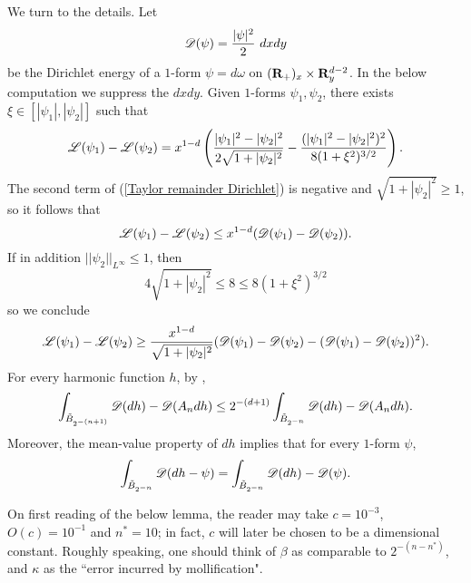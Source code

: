 We turn to the details.
Let
$$\mathscr D(\psi) = \frac{|\psi|^2}{2} ~dxdy$$
be the Dirichlet energy of a $1$-form $\psi = d\omega$ on $(\mathbf{R}_+)_x \times \mathbf{R}^{d - 2}_y$.
In the below computation we suppress the $dxdy$.
Given $1$-forms $\psi_1, \psi_2$, there exists $\xi \in [|\psi_1|, |\psi_2|]$ such that
\begin{equation}\label{Taylor remainder Dirichlet}
\mathscr L(\psi_1) - \mathscr L(\psi_2) = x^{1 - d}\left(\frac{|\psi_1|^2 - |\psi_2|^2}{2\sqrt{1 + |\psi_2|^2}} - \frac{(|\psi_1|^2 - |\psi_2|^2)^2}{8(1 + \xi^2)^{3/2}}\right).
\end{equation}
The second term of (\ref{Taylor remainder Dirichlet}) is negative and $\sqrt{1 + |\psi_2|^2} \geq 1$, so it follows that
\begin{equation}\label{Taylor lower bound}
\mathscr L(\psi_1) - \mathscr L(\psi_2) \leq x^{1 - d} (\mathscr D(\psi_1) - \mathscr D(\psi_2)).
\end{equation}
If in addition $||\psi_2||_{L^\infty} \leq 1$, then
$$4\sqrt{1 + |\psi_2|^2} \leq 8 \leq 8(1 + \xi^2)^{3/2}$$
so we conclude
\begin{equation}\label{Taylor upper bound}
\mathscr L(\psi_1) - \mathscr L(\psi_2) \geq \frac{x^{1 - d}}{\sqrt{1 + |\psi_2|^2}} (\mathscr D(\psi_1) - \mathscr D(\psi_2) - (\mathscr D(\psi_1) - \mathscr D(\psi_2))^2).
\end{equation}
For every harmonic function $h$, by \cite[Lemma 4.1]{Miranda66},
\begin{equation}\label{Miranda41}
\int_{\tilde B_{2^{-(n+1)}}} \mathscr D(dh) - \mathscr D(A_n dh) \leq 2^{-(d + 1)} \int_{\tilde B_{2^{-n}}} \mathscr D(dh) - \mathscr D(A_n dh).
\end{equation}
Moreover, the mean-value property of $dh$ implies that for every $1$-form $\psi$,
\begin{equation}\label{MVP derivative}
\int_{\tilde B_{2^{-n}}} \mathscr D(dh - \psi) = \int_{\tilde B_{2^{-n}}} \mathscr D(dh) - \mathscr D(\psi).
\end{equation}

On first reading of the below lemma, the reader may take $c = 10^{-3}$, $O(c) = 10^{-1}$ and $n^* = 10$; in fact, $c$ will later be chosen to be a dimensional constant.
Roughly speaking, one should think of $\beta$ as comparable to $2^{-(n - n^*)}$, and $\kappa$ as the ``error incurred by mollification".

